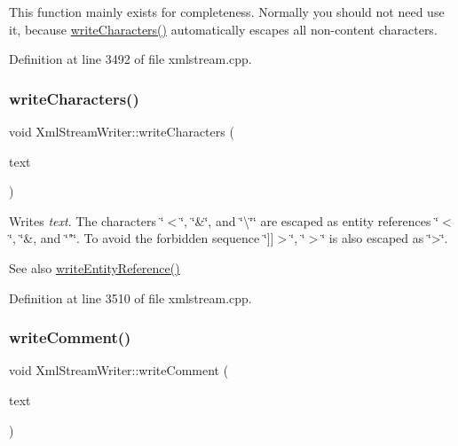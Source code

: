 This function mainly exists for completeness. Normally you should not need use it, because \hyperlink{class_xml_stream_writer_aea9dab80ea787794736d3f2a524780e5}{write\+Characters()} automatically escapes all non-\/content characters. 

Definition at line 3492 of file xmlstream.\+cpp.

\mbox{\label{class_xml_stream_writer_aea9dab80ea787794736d3f2a524780e5}} 
\subsubsection{\texorpdfstring{write\+Characters()}{writeCharacters()}}
{\footnotesize\ttfamily void Xml\+Stream\+Writer\+::write\+Characters (\begin{DoxyParamCaption}\item[{const Q\+String \&}]{text }\end{DoxyParamCaption})}

Writes {\itshape text}. The characters \char`\"{}$<$\char`\"{}, \char`\"{}\&\char`\"{}, and \char`\"{}\textbackslash{}\char`\"{}\char`\"{} are escaped as entity
references \char`\"{}$<$\char`\"{}, \char`\"{}\&, and \char`\"{}"\char`\"{}. To avoid the forbidden sequence \char`\"{}\mbox{]}\mbox{]}$>$\char`\"{}, \char`\"{}$>$\char`\"{} is also escaped as \char`\"{}>\char`\"{}.

\begin{DoxySeeAlso}{See also}
\hyperlink{class_xml_stream_writer_aeea05577f7ecd0eaa34b4237fdbe446d}{write\+Entity\+Reference()} 
\end{DoxySeeAlso}


Definition at line 3510 of file xmlstream.\+cpp.

\mbox{\label{class_xml_stream_writer_aa250fc649bdef6373d1f25d4bc7db431}} 
\subsubsection{\texorpdfstring{write\+Comment()}{writeComment()}}
{\footnotesize\ttfamily void Xml\+Stream\+Writer\+::write\+Comment (\begin{DoxyParamCaption}\item[{const Q\+String \&}]{text }\end{DoxyParamCaption})}

